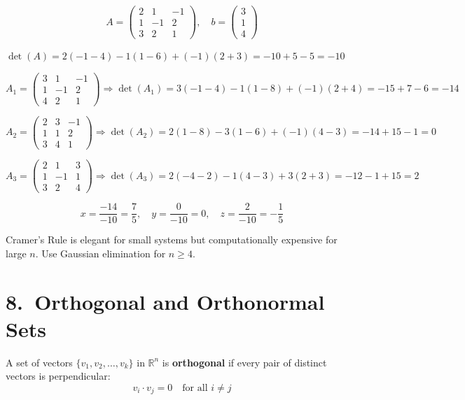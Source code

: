 \documentclass[12pt]{article}
\begin{document}
\[
A = \begin{pmatrix}2&1&-1\\1&-1&2\\3&2&1\end{pmatrix}, \quad
b = \begin{pmatrix}3\\1\\4\end{pmatrix}
\]

$\det(A) = 2(-1-4) - 1(1-6) + (-1)(2+3) = -10 + 5 - 5 = -10$

\[
A_1 = \begin{pmatrix}3&1&-1\\1&-1&2\\4&2&1\end{pmatrix} \Rightarrow \det(A_1) = 3(-1-4)-1(1-8)+(-1)(2+4) = -15+7-6 = -14
\]

\[
A_2 = \begin{pmatrix}2&3&-1\\1&1&2\\3&4&1\end{pmatrix} \Rightarrow \det(A_2) = 2(1-8)-3(1-6)+(-1)(4-3) = -14+15-1 = 0
\]

\[
A_3 = \begin{pmatrix}2&1&3\\1&-1&1\\3&2&4\end{pmatrix} \Rightarrow \det(A_3) = 2(-4-2)-1(4-3)+3(2+3) = -12-1+15 = 2
\]

\[
\boxed{x = \frac{-14}{-10} = \frac{7}{5},\quad y = \frac{0}{-10} = 0,\quad z = \frac{2}{-10} = -\frac{1}{5}}
\]

\begin{notebox}
Cramer's Rule is elegant for small systems but computationally expensive for large $n$. Use Gaussian elimination for $n \geq 4$.
\end{notebox}

\section{8.\ Orthogonal and Orthonormal Sets}

\begin{defbox}
A set of vectors $\{v_1, v_2, \ldots, v_k\}$ in $\mathbb{R}^n$ is \textbf{orthogonal} if every pair of distinct vectors is perpendicular:
\[
v_i \cdot v_j = 0 \quad \text{for all } i \neq j
\]
\end{defbox}
\end{document}
